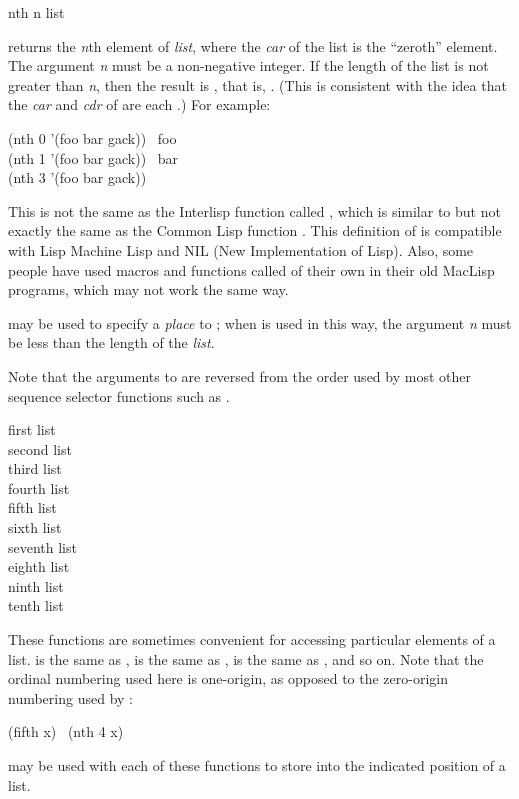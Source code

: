 \begin{defun}[Function]
nth n list

 returns the {\it n}th element of {\it list}, where
the {\it car} of the list is the ``zeroth'' element.
The argument {\it n} must be a non-negative integer.
If the length of the list is not greater than {\it n}, then the result
is {\emptylist}, that is, {\false}.
(This is consistent with the idea that the {\it car} and {\it cdr}
of {\emptylist} are each {\emptylist}.)
For example:
\begin{lisp}
(nth 0 '(foo bar gack)) \EV\ foo \\
(nth 1 '(foo bar gack)) \EV\ bar \\
(nth 3 '(foo bar gack)) \EV\ {\emptylist}
\end{lisp}

\beforenoterule
\begin{incompatibility}
This is not
the same as the Interlisp function called ,
which is similar to but not exactly the same as the Common Lisp function
.  This definition of  is compatible
with Lisp Machine Lisp and NIL (New Implementation of Lisp).
Also, some people have used macros and functions called  of their own in
their old MacLisp programs, which may not work the same way.
\end{incompatibility}
\afternoterule

 may be used to specify a {\it place} to ;
when  is used in this way, the argument {\it n} must be less
than the length of the {\it list}.

Note that the arguments to  are reversed from the order
used by most other sequence selector functions such as .
\end{defun}


\begin{defun}[Function]
first list \\
second list \\
third list \\
fourth list \\
fifth list \\
sixth list \\
seventh list \\
eighth list \\
ninth list \\
tenth list

These functions are sometimes convenient for accessing particular
elements of a list.   is the same as ,
 is the same as ,  is the
same as , and so on.
Note that the ordinal numbering used here is one-origin,
as opposed to the zero-origin numbering used by :
\begin{lisp}
(fifth x) \EQ\ (nth 4 x)
\end{lisp}

 may be used with each of these functions to store
into the indicated position of a list.
\end{defun}

